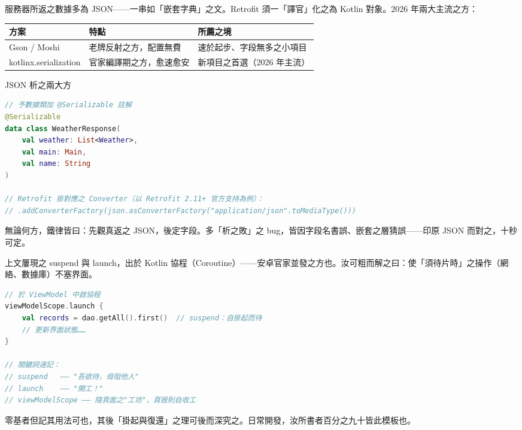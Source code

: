 
服務器所返之數據多為 JSON——一串如「嵌套字典」之文。Retrofit 須一「譯官」化之為 Kotlin 對象。2026 年兩大主流之方：

\begin{center}
\begin{tabularx}{\linewidth}{|X|X|X|}
\hline
\textbf{方案} & \textbf{特點} & \textbf{所薦之境} \tabularnewline
\hline
Gson / Moshi & 老牌反射之方，配置無費 & 速於起步、字段無多之小項目 \tabularnewline
kotlinx.serialization & 官家編譯期之方，愈速愈安 & 新項目之首選（2026 年主流） \tabularnewline
\hline
\end{tabularx}
\end{center}

\begin{center}\small\color{gray}JSON 析之兩大方\end{center}

\begin{lstlisting}[language=Kotlin]
// 予數據類加 @Serializable 註解
@Serializable
data class WeatherResponse(
    val weather: List<Weather>,
    val main: Main,
    val name: String
)

// Retrofit 掛對應之 Converter（以 Retrofit 2.11+ 官方支持為例）：
// .addConverterFactory(json.asConverterFactory("application/json".toMediaType()))
\end{lstlisting}

無論何方，鐵律皆曰：先觀真返之 JSON，後定字段。多「析之敗」之 bug，皆因字段名書誤、嵌套之層猜誤——印原 JSON 而對之，十秒可定。



上文屢現之 suspend 與 launch，出於 Kotlin 協程（Coroutine）——安卓官家並發之方也。汝可粗而解之曰：使「須待片時」之操作（網絡、數據庫）不塞界面。

\begin{lstlisting}[language=Kotlin]
// 於 ViewModel 中啟協程
viewModelScope.launch {
    val records = dao.getAll().first()  // suspend：自掛起而待
    // 更新界面狀態……
}

// 關鍵詞速記：
// suspend   —— "吾欲待，毋阻他人"
// launch    —— "開工！"
// viewModelScope —— 隨頁面之"工坊"，頁毀則自收工
\end{lstlisting}

零基者但記其用法可也，其後「掛起與復還」之理可後而深究之。日常開發，汝所書者百分之九十皆此模板也。

